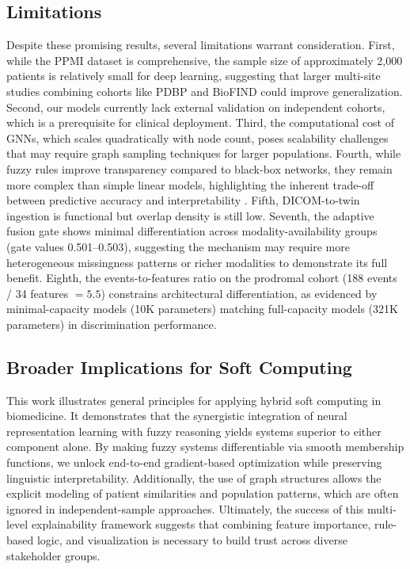\documentclass[journal,twoside,web]{ieeecolor}
\begin{document}
\subsection{Limitations}

Despite these promising results, several limitations warrant consideration. First, while the PPMI dataset is comprehensive, the sample size of approximately 2,000 patients is relatively small for deep learning, suggesting that larger multi-site studies combining cohorts like PDBP and BioFIND could improve generalization. Second, our models currently lack external validation on independent cohorts, which is a prerequisite for clinical deployment. Third, the computational cost of GNNs, which scales quadratically with node count, poses scalability challenges that may require graph sampling techniques \cite{hamilton2017inductive} for larger populations. Fourth, while fuzzy rules improve transparency compared to black-box networks, they remain more complex than simple linear models, highlighting the inherent trade-off between predictive accuracy and interpretability \cite{rudin2019stop}. Fifth, DICOM-to-twin ingestion is functional but overlap density is still low. Seventh, the adaptive fusion gate shows minimal differentiation across modality-availability groups (gate values 0.501--0.503), suggesting the mechanism may require more heterogeneous missingness patterns or richer modalities to demonstrate its full benefit. Eighth, the events-to-features ratio on the prodromal cohort (188 events / 34 features $= 5.5$) constrains architectural differentiation, as evidenced by minimal-capacity models (10K parameters) matching full-capacity models (321K parameters) in discrimination performance.

\subsection{Broader Implications for Soft Computing}

This work illustrates general principles for applying hybrid soft computing in biomedicine. It demonstrates that the synergistic integration of neural representation learning with fuzzy reasoning yields systems superior to either component alone. By making fuzzy systems differentiable via smooth membership functions, we unlock end-to-end gradient-based optimization while preserving linguistic interpretability. Additionally, the use of graph structures allows the explicit modeling of patient similarities and population patterns, which are often ignored in independent-sample approaches. Ultimately, the success of this multi-level explainability framework suggests that combining feature importance, rule-based logic, and visualization is necessary to build trust across diverse stakeholder groups.
\end{document}
